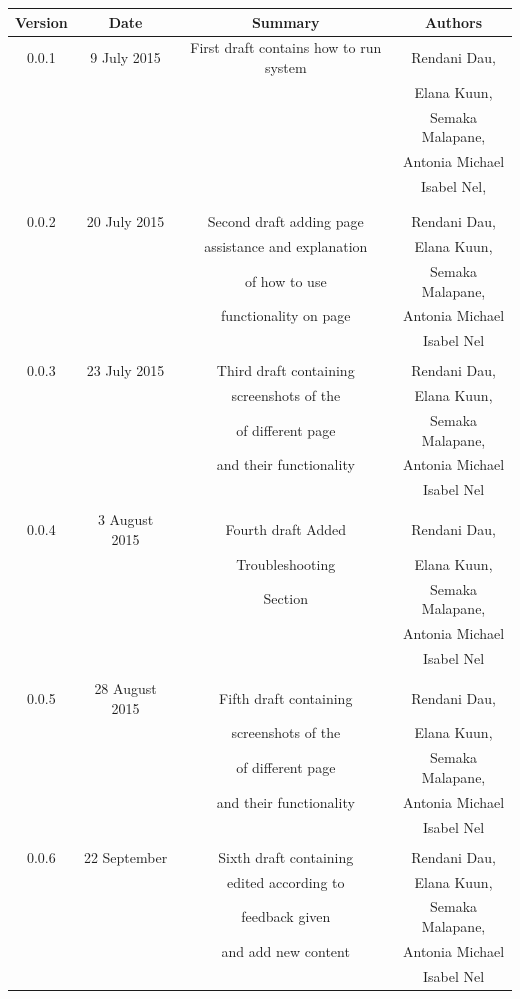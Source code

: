 \documentclass[a4paper,12pt]{report}
\begin{document}
\begin{table}[h!]
\centering
 \begin{tabular}{||c c c c||} 
 \hline
 \textbf{Version} & \textbf{Date} & \textbf{Summary} & \textbf{Authors} \\ [0.5ex] 
 \hline\hline
 0.0.1 & 9 July 2015 &  First draft contains how to run system  & Rendani Dau, \\ & & & Elana Kuun, \\ & & & Semaka Malapane, \\ & & & Antonia Michael \\ & & & Isabel Nel, \\ & & & \\
 \hline 
 & & & \\
 0.0.2 & 20 July 2015 &  Second draft adding page  & Rendani Dau, \\ & & assistance and explanation & Elana Kuun, \\ & & of how to use & Semaka Malapane, \\ & & functionality on page &  Antonia Michael \\ & & & Isabel Nel \\   [1ex]  
 \hline 
 & & & \\
 0.0.3& 23 July 2015 &  Third draft containing  & Rendani Dau, \\ & & screenshots of the & Elana Kuun, \\ & & of different page & Semaka Malapane, \\ & & and their functionality &  Antonia Michael \\ & & & Isabel Nel \\   [1ex]  
 \hline
 & & & \\
 0.0.4& 3 August 2015 &  Fourth draft Added  & Rendani Dau, \\ & & Troubleshooting & Elana Kuun, \\ & & Section & Semaka Malapane, \\ & &  &  Antonia Michael \\ & & & Isabel Nel \\   [1ex]  
  \hline 
 & & & \\
 0.0.5& 28 August 2015 &  Fifth draft containing  & Rendani Dau, \\ & & screenshots of the & Elana Kuun, \\ & & of different page & Semaka Malapane, \\ & & and their functionality &  Antonia Michael \\ & & & Isabel Nel \\   [1ex]  
  \hline 
 & & & \\
 0.0.6& 22 September &  Sixth draft containing  & Rendani Dau, \\ & & edited according to & Elana Kuun, \\ & & feedback given & Semaka Malapane, \\ & & and add new content &  Antonia Michael \\ & & & Isabel Nel \\   [1ex]  
\hline
 \end{tabular}
\end{table}
\end{document}
